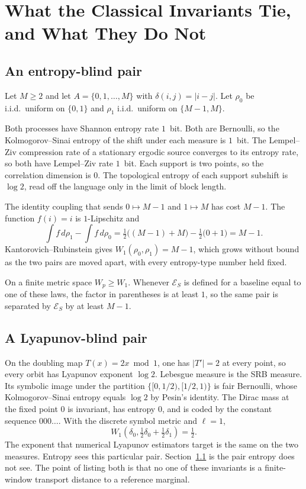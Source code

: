 \documentclass[11pt,reqno]{amsart}
\theoremstyle{remark}
\newcommand{\ES}{\mathcal{E}_S}
\begin{document}
\section{What the Classical Invariants Tie, and What They Do Not}\label{sec:ties}

\subsection{An entropy-blind pair}\label{subsec:entropy-blind}

Let $M \ge 2$ and let $A = \{0,1,\ldots,M\}$ with $\delta(i,j) = |i-j|$. Let $\rho_0$ be i.i.d.\ uniform on $\{0,1\}$ and $\rho_1$ i.i.d.\ uniform on $\{M-1, M\}$.

Both processes have Shannon entropy rate $1$~bit. Both are Bernoulli, so the Kolmogorov--Sinai entropy of the shift under each measure is $1$~bit. The Lempel--Ziv compression rate of a stationary ergodic source converges to its entropy rate, so both have Lempel--Ziv rate $1$~bit. Each support is two points, so the correlation dimension is $0$. The topological entropy of each support subshift is $\log 2$, read off the language only in the limit of block length.

The identity coupling that sends $0 \mapsto M-1$ and $1 \mapsto M$ has cost $M-1$. The function $f(i) = i$ is $1$-Lipschitz and
\[
\int f \,d\rho_1 - \int f \,d\rho_0 = \tfrac12\bigl((M-1)+M\bigr) - \tfrac12\bigl(0+1\bigr) = M-1.
\]
Kantorovich--Rubinstein gives $W_1(\rho_0,\rho_1) = M-1$, which grows without bound as the two pairs are moved apart, with every entropy-type number held fixed.

On a finite metric space $W_p \ge W_1$. Whenever $\ES$ is defined for a baseline equal to one of these laws, the factor in parentheses is at least $1$, so the same pair is separated by $\ES$ by at least $M-1$.

\subsection{A Lyapunov-blind pair}\label{subsec:lyapunov-blind}

On the doubling map $T(x) = 2x \bmod 1$, one has $|T'| = 2$ at every point, so every orbit has Lyapunov exponent $\log 2$. Lebesgue measure is the SRB measure. Its symbolic image under the partition $\{[0,1/2),[1/2,1)\}$ is fair Bernoulli, whose Kolmogorov--Sinai entropy equals $\log 2$ by Pesin's identity. The Dirac mass at the fixed point $0$ is invariant, has entropy $0$, and is coded by the constant sequence $000\ldots$. With the discrete symbol metric and $\ell = 1$,
\[
W_1(\delta_0, \tfrac12\delta_0 + \tfrac12\delta_1) = \tfrac12.
\]
The exponent that numerical Lyapunov estimators target is the same on the two measures. Entropy sees this particular pair. Section~\ref{subsec:entropy-blind} is the pair entropy does not see. The point of listing both is that no one of these invariants is a finite-window transport distance to a reference marginal.
\end{document}
